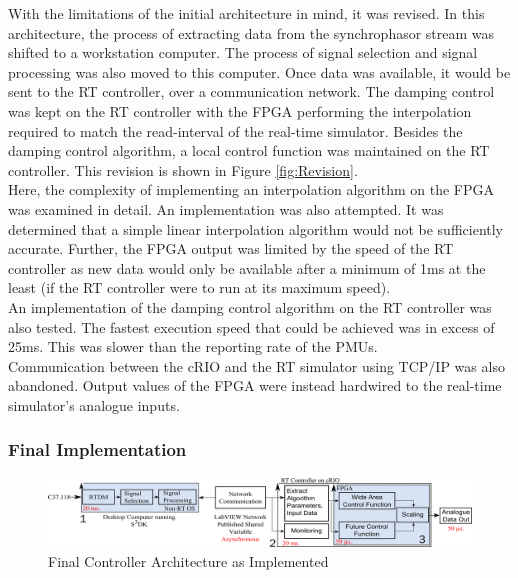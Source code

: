 \documentclass[conference]{IEEEtran}
\begin{document}
With the limitations of the initial architecture in mind, it was revised. In this architecture, the process of  extracting data from the synchrophasor stream was shifted to a workstation computer. The process of signal selection and signal processing was also moved to this computer. Once data was available, it would be sent to the RT controller, over a communication network. The damping control was kept on the RT controller with the FPGA performing the interpolation required to match the read-interval of the real-time simulator. Besides the damping control algorithm, a local control function was maintained on the RT controller. This revision is shown in Figure \ref{fig:Revision}.\\

Here, the complexity of implementing an interpolation algorithm on the FPGA was examined in detail. An implementation was also attempted. It was determined that a simple linear interpolation algorithm would not be sufficiently accurate. Further, the FPGA output was limited by the speed of the RT controller as new data would only be available after a minimum of 1ms at the least (if the RT controller were to run at its maximum speed). \\

An implementation of the damping control algorithm on the RT controller was also tested. The fastest execution speed that could be achieved was in excess of 25ms. This was slower than the reporting rate of the PMUs.\\

Communication between the cRIO and the RT simulator using TCP/IP was also abandoned. Output values of the FPGA were instead hardwired to the real-time simulator's analogue inputs.\\

\subsubsection{Final Implementation}


\begin{figure}[!t]
\centering
\includegraphics[width=5in]{Final_RT_Arch.png} 
\caption{Final Controller Architecture as Implemented}
\label{Final_arch}
\end{figure}
\end{document}
